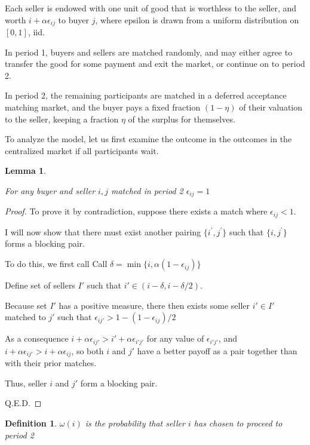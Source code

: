 \documentclass[WP]{AEA}
\newtheorem{lemma}{Lemma}
\newtheorem{deff}{Definition}
\begin{document}
Each seller is endowed with one unit of good that is worthless to the seller, and worth $i+\alpha  \epsilon_{ij}$ to buyer $j$, where epsilon is drawn from a uniform distribution on $[0,1]$, iid.

In period 1, buyers and sellers are matched randomly, and may either agree to transfer the good for some payment and exit the market, or continue on to period 2.

In period 2, the remaining participants are matched in a deferred acceptance matching market, and the buyer pays a fixed fraction $(1-\eta)$ of their valuation to the seller, keeping a fraction $\eta$ of the surplus for themselves.

To analyze the model, let us first examine the outcome in the outcomes in the centralized market if all participants wait. 


\begin{lemma} \label{lemma:e_1}

For any buyer and seller ${i, j}$ matched in period 2  $\epsilon_{ij} = 1$
\end{lemma}
\begin{proof}
	To prove it by contradiction, suppose there exists a match where $\epsilon_{ij} < 1$.

	I will now show that there must exist another pairing $ \{i^{'}, j^{'} \} $ such that 	$\{i,j^{'} \}$ forms a blocking pair. 

	To do this, we first call	
	Call $\delta = \min{\{i, \alpha(1-  \epsilon_{ij})\}}$
	
	Define set of sellers $I'$ such that $i' \in (i-\delta, i-\delta / 2)$.
	
	Because set $I'$ has a positive measure, there then exists some seller $i' \in I'$ matched to $j'$ such that $  \epsilon_{ij'} > 1-(1- \epsilon_{ij}) / 2$
	
	As a consequence $i+ \alpha \epsilon_{ij'} > i' + \alpha \epsilon_{i'j'}$ for any value of $\epsilon_{i'j'}$, and $i+ \alpha \epsilon_{ij'} > i + \alpha \epsilon_{ij}$, so both $i$ and $j'$ have a better payoff as a pair together than with their prior matches.
	
	Thus, seller $i$ and $j'$ form a blocking pair.
	
	Q.E.D.
\end{proof}

\begin{deff}
	$\omega(i) $ is the probability that seller $i$ has chosen to proceed to period 2

\end{deff}
\end{document}
